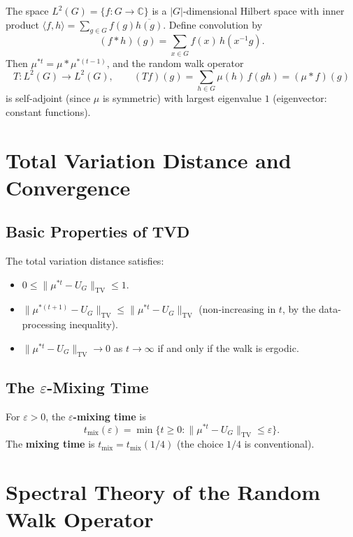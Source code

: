 The space $L^2(G) = \{f : G \to \mathbb{C}\}$ is a $|G|$-dimensional Hilbert
space with inner product $\langle f, h \rangle = \sum_{g \in G} f(g)\overline{h(g)}$.
Define convolution by
\[
  (f * h)(g) = \sum_{x \in G} f(x)\,h(x^{-1}g).
\]
Then $\mu^{*t} = \mu * \mu^{*(t-1)}$, and the random walk operator
\[
  T : L^2(G) \to L^2(G), \qquad (Tf)(g) = \sum_{h \in G} \mu(h)\,f(gh) = (\mu * f)(g)
\]
is self-adjoint (since $\mu$ is symmetric) with largest eigenvalue $1$
(eigenvector: constant functions).

\section{Total Variation Distance and Convergence}

\subsection{Basic Properties of TVD}

The total variation distance satisfies:
\begin{itemize}
  \item $0 \leq \|\mu^{*t} - U_G\|_{\mathrm{TV}} \leq 1$.
  \item $\|\mu^{*(t+1)} - U_G\|_{\mathrm{TV}} \leq \|\mu^{*t} - U_G\|_{\mathrm{TV}}$
        (non-increasing in $t$, by the data-processing inequality).
  \item $\|\mu^{*t} - U_G\|_{\mathrm{TV}} \to 0$ as $t \to \infty$
        if and only if the walk is ergodic.
\end{itemize}

\subsection{The \texorpdfstring{$\varepsilon$}{epsilon}-Mixing Time}

\begin{definition}
For $\varepsilon > 0$, the \textbf{$\varepsilon$-mixing time} is
\[
  t_{\mathrm{mix}}(\varepsilon) = \min\{t \geq 0 : \|\mu^{*t} - U_G\|_{\mathrm{TV}} \leq \varepsilon\}.
\]
The \textbf{mixing time} is $t_{\mathrm{mix}} = t_{\mathrm{mix}}(1/4)$ (the choice $1/4$ is conventional).
\end{definition}

\section{Spectral Theory of the Random Walk Operator}

